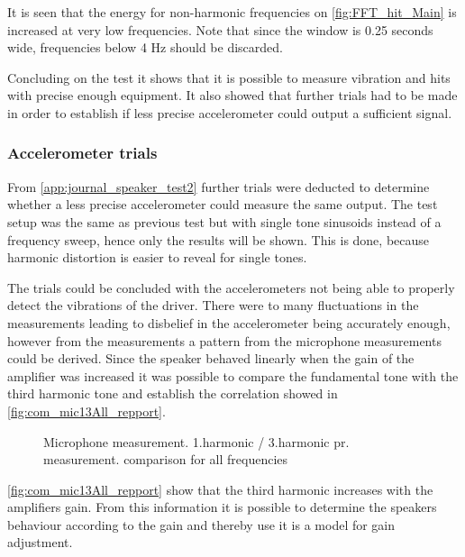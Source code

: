 %


It is seen that the energy for non-harmonic frequencies on \autoref{fig:FFT_hit_Main} is increased at very low frequencies. %
Note that since the window is 0.25 seconds wide, frequencies below 4 Hz should be discarded.

Concluding on the test it shows that it is possible to measure vibration and hits with precise enough equipment. It also showed that further trials had to be made in order to establish if less precise accelerometer could output a sufficient signal.

\subsubsection{Accelerometer trials}

From \autoref{app:journal_speaker_test2} further trials were deducted to determine whether a less precise accelerometer could measure the same output. The test setup was the same as previous test but with single tone sinusoids instead of a frequency sweep, hence only the results will be shown. This is done, because harmonic distortion is easier to reveal for single tones. %

The trials could be concluded with the accelerometers not being able to properly detect the vibrations of the driver. There were to many fluctuations in the measurements leading to disbelief in the accelerometer being accurately enough, however from the measurements a pattern from the microphone measurements could be derived. Since the speaker behaved linearly when the gain of the amplifier was increased it was possible to compare the fundamental tone with the third harmonic tone and establish the correlation showed in \autoref{fig:com_mic13All_repport}.

\begin{figure}[H]
    \centering
    
    \caption{Microphone measurement. 1.harmonic / 3.harmonic pr. measurement. comparison for all frequencies}
\label{fig:com_mic13All_repport}
\end{figure}  

\autoref{fig:com_mic13All_repport} show that the third harmonic increases with the amplifiers gain. From this information it is possible to determine the speakers behaviour according to the gain and thereby use it is a model for gain adjustment.


